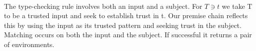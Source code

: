 {\begin{code}
\AgdaSymbol{(}\AgdaSpace{}%
\AgdaSymbol{)}\AgdaSpace{}%
\AgdaSymbol{(}\AgdaSpace{}%
\AgdaSymbol{)}\AgdaSpace{}%
\AgdaSymbol{=}\AgdaSpace{}%
\AgdaSpace{}%
\AgdaSpace{}%
\AgdaSymbol{(}\AgdaSpace{}%
\AgdaSpace{}%
\AgdaSpace{}%
\AgdaSymbol{(}\AgdaSpace{}%
\AgdaSymbol{))}\<%
\\
\>[0]\AgdaSpace{}%
\AgdaSymbol{(}\AgdaSpace{}%
\AgdaSymbol{)}\AgdaSpace{}%
\AgdaSymbol{(}\AgdaSpace{}%
\AgdaSymbol{)}\AgdaSpace{}%
\AgdaSymbol{(}\AgdaSpace{}%
\AgdaSymbol{(}\AgdaSpace{}%
\AgdaOperator{\AgdaInductiveConstructor{,}}\AgdaSpace{}%
\AgdaSymbol{))}\AgdaSpace{}%
\AgdaSymbol{=}\AgdaSpace{}%
\AgdaSpace{}%
\AgdaSpace{}%
\AgdaSymbol{(}\AgdaSpace{}%
\AgdaSpace{}%
\AgdaSpace{}%
\AgdaSymbol{(}\AgdaSpace{}%
\AgdaSymbol{(}\AgdaSpace{}%
\AgdaOperator{\AgdaInductiveConstructor{,}}\AgdaSpace{}%
\AgdaSpace{}%
\AgdaSpace{}%
\AgdaSpace{}%
\AgdaSpace{}%
\AgdaSymbol{(}\AgdaSpace{}%
\AgdaSpace{}%
\AgdaSymbol{)))))}\<%
\end{code}
}
The type-checking rule involves both an input and a subject. For
$T ∋ t$ we take T to be a trusted input and seek to establish trust
in t. Our premise chain reflects this by using the input as its
trusted pattern and seeking trust in the subject. Matching occurs on
both the input and the subject. If successful it returns a pair of
environments.
\begin{code}%
\>[0]\AgdaSpace{}%
\AgdaSpace{}%
\AgdaSymbol{:}\AgdaSpace{}%
\AgdaSpace{}%
\<%
\\
\>[0][@{}l@{\AgdaIndent{0}}]%
\>[2]\<%
\\
\>[2][@{}l@{\AgdaIndent{0}}]%
\>[4]%
\>[13]\AgdaSymbol{:}\AgdaSpace{}%
\AgdaSpace{}%
\<%
\\
%
\>[4]%
\>[13]\AgdaSymbol{:}\AgdaSpace{}%
\AgdaSpace{}%
\<%
\\
%
\>[4]\AgdaSpace{}%
\AgdaSymbol{:}\AgdaSpace{}%
\AgdaFunction{Σ[}\AgdaSpace{}%
\AgdaSpace{}%
\AgdaSpace{}%
\AgdaSpace{}%
\AgdaSpace{}%
\AgdaFunction{]}\AgdaSpace{}%
\AgdaSpace{}%
\AgdaSpace{}%
\AgdaSpace{}%
\<%
\\
\>[0]\AgdaSpace{}%
\<%
\end{code}
